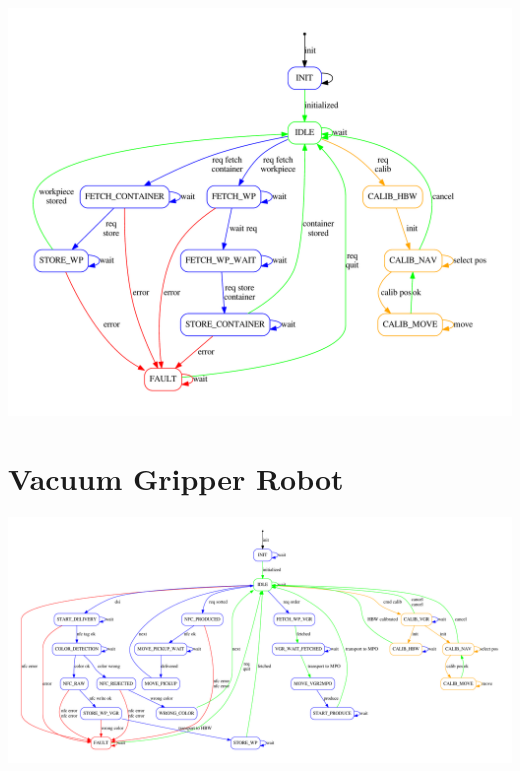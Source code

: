 \begin{DoxyImageNoCaption}
  \mbox{\includegraphics[width=\textwidth,height=\textheight/2,keepaspectratio=true]{dot_TxtHighBayWarehouseRun}}
\end{DoxyImageNoCaption}
\hypertarget{Overview State Machines_VGR}{}\section{Vacuum Gripper Robot}\label{Overview State Machines_VGR}

\begin{DoxyImageNoCaption}
  \mbox{\includegraphics[width=\textwidth,height=\textheight/2,keepaspectratio=true]{dot_TxtVacuumGripperRobotRun}}
\end{DoxyImageNoCaption}
 